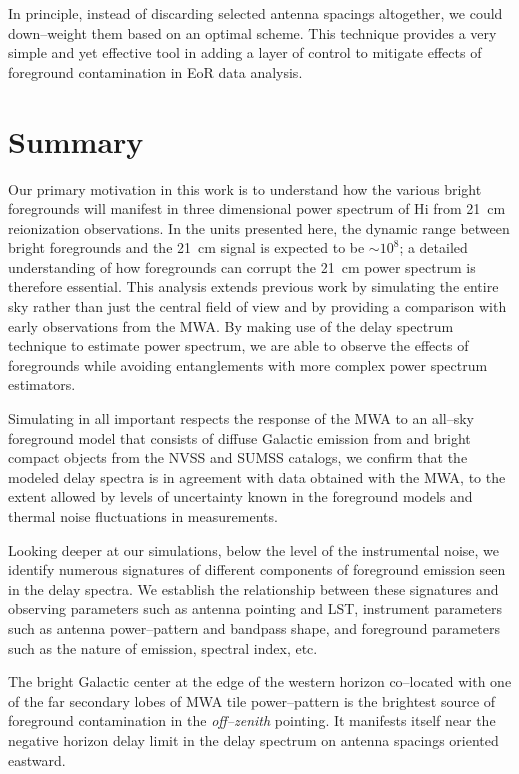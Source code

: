 \documentclass[preprint2,iop,numberedappendix]{emulateapj}
\begin{document}
In principle, instead of discarding selected antenna spacings altogether, we could down--weight them based on an optimal scheme. This technique provides a very simple and yet effective tool in adding a layer of control to mitigate effects of foreground contamination in EoR data analysis. %

\section{Summary}\label{sec:summary}

Our primary motivation in this work is to understand how the various bright foregrounds will manifest in three dimensional power spectrum of H{\sc i} from 21~cm reionization observations. In the units presented here, the dynamic range between bright foregrounds and the 21~cm signal is expected to be $\sim 10^8$; a detailed understanding of how foregrounds can corrupt the 21~cm power spectrum is therefore essential. This analysis extends previous work by simulating the entire sky rather than just the central field of view and by providing a comparison with early observations from the MWA. By making use of the delay spectrum technique to estimate power spectrum, we are able to observe the effects of foregrounds while avoiding entanglements with more complex power spectrum estimators.  

Simulating in all important respects the response of the MWA to an all--sky foreground model that consists of diffuse Galactic emission from \citet{deo08} and bright compact objects from the NVSS and SUMSS catalogs, we confirm that the modeled delay spectra is in agreement with data obtained with the MWA, to the extent allowed by levels of uncertainty known in the foreground models and thermal noise fluctuations in measurements. 

Looking deeper at our simulations, below the level of the instrumental noise,  we identify numerous signatures of different components of foreground emission seen in the delay spectra. We establish the relationship between these signatures and observing parameters such as antenna pointing and LST, instrument parameters such as antenna power--pattern and bandpass shape, and foreground parameters such as the nature of emission, spectral index, etc. 

The bright Galactic center at the edge of the western horizon co--located with one of the far secondary lobes of MWA tile power--pattern is the brightest source of foreground contamination in the {\it off--zenith} pointing. It manifests itself near the negative horizon delay limit in the delay spectrum on antenna spacings oriented eastward. 
\end{document}
